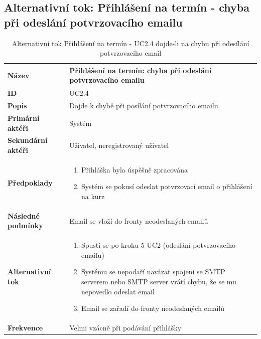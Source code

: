 \documentclass[12pt,a4paper,titlepage,final]{report}
\begin{document}
\subsection{Alternativní tok: Přihlášení na termín - chyba při odeslání potvrzovacího emailu}
\begin{table}[!h]
\begin{center}
    \begin{tabular}{ | p{4.5cm} | p{13cm} | }
    \hline
    \textbf{Název} & Přihlášení na termín: chyba při odeslání potvrzovacího emailu
    \\ \hline
    
	\textbf{ID} & UC2.4
	\\ \hline
	
	\textbf{Popis} & Dojde k chybě při posílání potvrzovacího emailu
	\\ \hline
	    
	\textbf{Primární aktéři} & Systém
	\\ \hline
	
	\textbf{Sekundární aktéři} & Uživatel, neregistrovaný  uživatel
	\\ \hline
	
	\textbf{Předpoklady} & 
    \vspace{-3.5mm}
	\begin{enumerate}
        \itemsep0em 		
		\item Přihláška byla úspěšně zpracována
		\item Systém se pokusí odeslat potvrzovací email o přihlášení na kurz		
	\end{enumerate}
    \\ \hline
    
    \textbf{Následné podmínky} & Email se vloží do fronty neodeslaných emailů
    \\ \hline 
    
    \textbf{Alternativní tok} & 

        \vspace{-3.5mm}  
		\begin{enumerate}
	        \itemsep0em 			
			\item Spustí se po kroku 5 UC2 (odeslání potvrzovacího emailu)
			\item Systému se nepodaří navázat spojení se SMTP serverem nebo SMTP server vrátí chybu, že se mu nepovedlo odeslat email
			\item Email se zařadí do fronty neodeslaných emailů
		\end{enumerate}		       
    \\ \hline    
    
	\textbf{Frekvence} & Velmi vzácně při podávání přihlášky
	\\ \hline
	\end{tabular}
\end{center}
	\caption{Alternativní tok Přihlášení na termín - UC2.4 dojde-li na chybu při odesílání potvrzovacího email}
\end{table}
\end{document}
